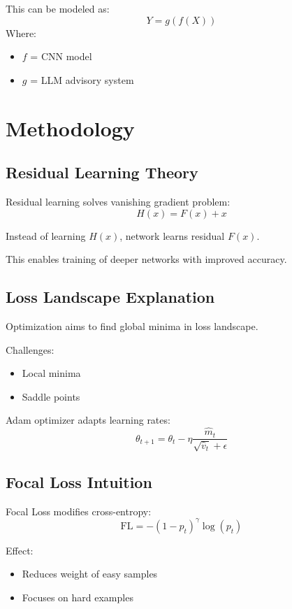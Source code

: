 \documentclass[journal,twocolumn,10pt]{IEEEtran}
\begin{document}
This can be modeled as:
\begin{equation}
Y = g(f(X))
\end{equation}
Where:
\begin{itemize}
\item $f$ = CNN model
\item $g$ = LLM advisory system
\end{itemize}

\section{Methodology}

\subsection{Residual Learning Theory}
Residual learning solves vanishing gradient problem:
\begin{equation}
H(x) = F(x) + x
\end{equation}

Instead of learning $H(x)$, network learns residual $F(x)$.

This enables training of deeper networks with improved accuracy.

\subsection{Loss Landscape Explanation}
Optimization aims to find global minima in loss landscape.

Challenges:
\begin{itemize}
\item Local minima
\item Saddle points
\end{itemize}

Adam optimizer adapts learning rates:
\begin{equation}
\theta_{t+1} = \theta_t - \eta \frac{\hat{m}_t}{\sqrt{\hat{v}_t} + \epsilon}
\end{equation}

\subsection{Focal Loss Intuition}
Focal Loss modifies cross-entropy:
\begin{equation}
\text{FL} = -(1 - p_t)^\gamma \log(p_t)
\end{equation}

Effect:
\begin{itemize}
\item Reduces weight of easy samples
\item Focuses on hard examples
\end{itemize}
\end{document}

